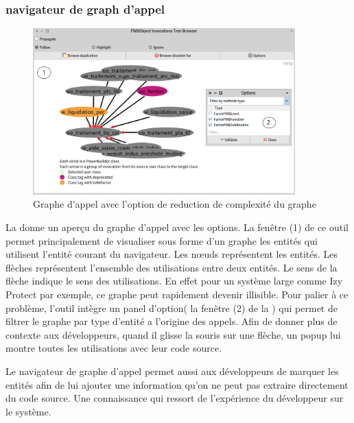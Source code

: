 \documentclass[a4paper]{article}
\begin{document}
\subsubsection{navigateur de graph d'appel}
\begin{figure}[htbp]
  \begin{center}
  \includegraphics[width=0.9\textwidth]{./figures/callGraphBrowser.png}
  \caption{Graphe d'appel avec l'option de reduction de complexité du graphe}
  \label{fig:graphAppel}
\end{center}
\vspace{-0.3cm}
\end{figure}
La  donne un aperçu du graphe d'appel avec les options.  
 La fenêtre (1) de ce outil permet principalement de visualiser sous forme d'un graphe les entités qui utilisent l'entité courant du navigateur.
Les nœuds représentent les entités. Les flèches représentent l'ensemble des utilisations entre deux entités.
Le sens de la flèche indique le sens des utilisations.
En effet pour un système large comme Izy Protect par exemple, ce graphe peut rapidement devenir illisible. 
Pour palier à ce problème, l'outil intègre un panel d'option( la fenêtre (2) de la ) qui permet de filtrer le graphe par type d'entité a l'origine des appels.
Afin de donner plus de contexte aux développeurs, quand il glisse la souris sur une flèche, un popup lui montre toutes les utilisations avec leur code source.

Le navigateur de graphe d'appel permet aussi aux développeurs de marquer les entités afin de lui ajouter une information qu'on ne peut pas extraire directement du code source.
Une connaissance qui ressort de l'expérience du développeur sur le système.
\end{document}
